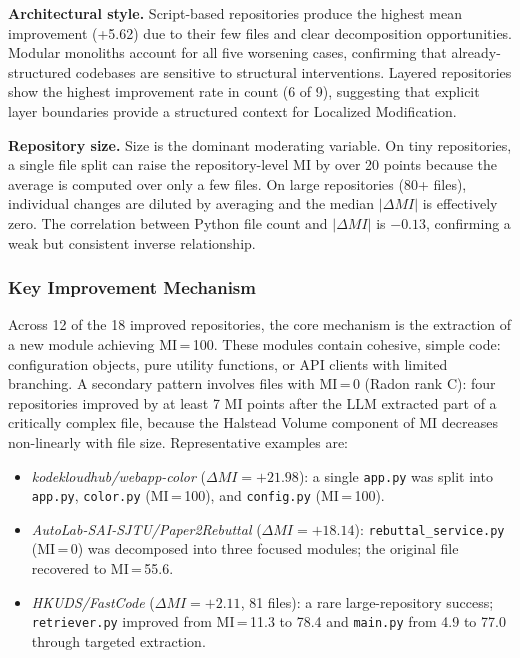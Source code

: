 \textbf{Architectural style.} Script-based repositories produce the highest mean improvement (+5.62) due to their few files and clear decomposition opportunities. Modular monoliths account for all five worsening cases, confirming that already-structured codebases are sensitive to structural interventions. Layered repositories show the highest improvement rate in count (6 of 9), suggesting that explicit layer boundaries provide a structured context for Localized Modification.

\textbf{Repository size.} Size is the dominant moderating variable. On tiny repositories, a single file split can raise the repository-level MI by over 20 points because the average is computed over only a few files. On large repositories (80+ files), individual changes are diluted by averaging and the median $|\Delta MI|$ is effectively zero. The correlation between Python file count and $|\Delta MI|$ is $-0.13$, confirming a weak but consistent inverse relationship.

\subsubsection*{Key Improvement Mechanism}

Across 12 of the 18 improved repositories, the core mechanism is the extraction of a new module achieving MI\,=\,100. These modules contain cohesive, simple code: configuration objects, pure utility functions, or API clients with limited branching. A secondary pattern involves files with MI\,=\,0 (Radon rank C): four repositories improved by at least 7 MI points after the LLM extracted part of a critically complex file, because the Halstead Volume component of MI decreases non-linearly with file size. Representative examples are:

\begin{itemize}[nosep]
    \item \textit{kodekloudhub/webapp-color} ($\Delta MI = +21.98$): a single \texttt{app.py} was split into \texttt{app.py}, \texttt{color.py} (MI\,=\,100), and \texttt{config.py} (MI\,=\,100).
    \item \textit{AutoLab-SAI-SJTU/Paper2Rebuttal} ($\Delta MI = +18.14$): \texttt{rebuttal\_service.py} (MI\,=\,0) was decomposed into three focused modules; the original file recovered to MI\,=\,55.6.
    \item \textit{HKUDS/FastCode} ($\Delta MI = +2.11$, 81 files): a rare large-repository success; \texttt{retriever.py} improved from MI\,=\,11.3 to 78.4 and \texttt{main.py} from 4.9 to 77.0 through targeted extraction.
\end{itemize}

